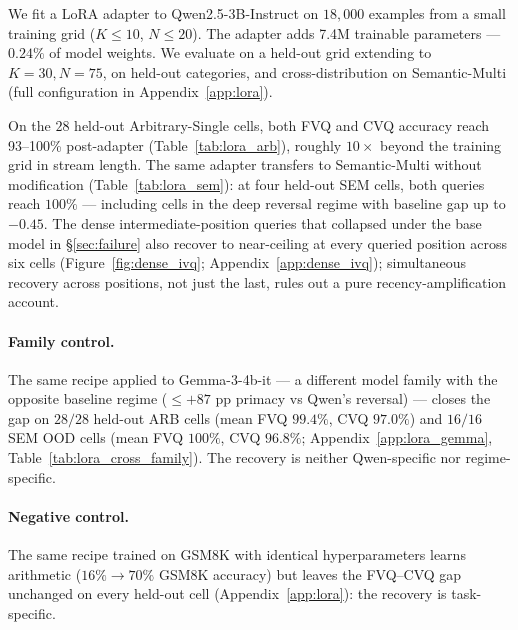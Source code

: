 \documentclass[11pt]{article}
\begin{document}
We fit a LoRA adapter \citep{hu2021lora} to Qwen2.5-3B-Instruct on
$18{,}000$ examples from a small training grid ($K \le 10$,
$N \le 20$). The adapter adds 7.4M trainable parameters ---
$0.24\%$ of model weights. We evaluate on a held-out grid extending
to $K{=}30, N{=}75$, on held-out categories, and cross-distribution
on Semantic-Multi (full configuration in Appendix~\ref{app:lora}).

On the $28$ held-out Arbitrary-Single cells, both FVQ and CVQ
accuracy reach 93--100\% post-adapter (Table~\ref{tab:lora_arb}),
roughly $10\times$ beyond the training grid in stream length.
The same adapter transfers to Semantic-Multi without modification
(Table~\ref{tab:lora_sem}): at four held-out SEM cells, both
queries reach $100\%$ --- including cells in the deep reversal
regime with baseline gap up to $-0.45$.
The dense intermediate-position queries that collapsed under the
base model in \S\ref{sec:failure} also recover to near-ceiling at
every queried position across six cells (Figure~\ref{fig:dense_ivq};
Appendix~\ref{app:dense_ivq}); simultaneous recovery across
positions, not just the last, rules out a pure
recency-amplification account.

\paragraph{Family control.} The same recipe applied to
Gemma-3-4b-it --- a different model family with the opposite
baseline regime ($\le {+}87$ pp primacy vs Qwen's reversal) ---
closes the gap on $28/28$ held-out ARB cells (mean FVQ $99.4\%$,
CVQ $97.0\%$) and $16/16$ SEM OOD cells (mean FVQ $100\%$,
CVQ $96.8\%$; Appendix~\ref{app:lora_gemma}, Table~\ref{tab:lora_cross_family}). The recovery is
neither Qwen-specific nor regime-specific.

\paragraph{Negative control.} The same recipe trained on GSM8K
with identical hyperparameters learns arithmetic
($16\% \to 70\%$ GSM8K accuracy) but leaves the FVQ--CVQ gap
unchanged on every held-out cell (Appendix~\ref{app:lora}): the
recovery is task-specific.
\end{document}

